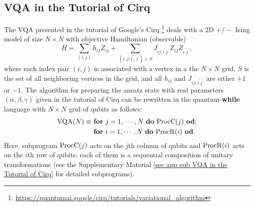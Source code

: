 \documentclass[conference,compsoc, 10pt]{IEEEtran}
\newcommand{\jh}[1]{\textit{\color{red}[JH] : #1}}
\newcommand{\lz}[1]{\textit{\color{blue}[LZ] : #1}}
\begin{document}
	\subsection{VQA in the Tutorial of Cirq}
	
	The VQA presented in the tutorial of Google's Cirq \footnote{\url{https://quantumai.google/cirq/tutorials/variational_algorithm}} deals with a 2D $+/-$ Ising model of size $N\times N$ with objective Hamiltonian (observable)
	$$H = \sum_{(i,j)}h_{ij}Z_{ij} + \sum_{(i,j;i^\prime,j^\prime)\in S}J_{ij;i^\prime j^\prime}Z_{ij}Z_{i^\prime j^\prime},$$
	where each index pair $(i,j)$ is associated with a vertex in a the $N\times N$ grid, $S$ is the set of all neighboring vertices in the grid, and all $h_{ij}$ and $J_{ij;i^\prime j^\prime}$ are either $+1$ or $-1$.
	The algorithm for preparing the ansatz state with real parameters $(\alpha,\beta,\gamma)$ given in the tutorial of Cirq can be rewritten in the quantum-{\bf while} language with $N\times N$ grid of qubits as follows:
	\begin{align*}
	{\rm VQA}(N)\equiv\ &{\bf for\ } j = 1,\cdots,N {\bf\ do}\ {\rm ProcC}(j)\ {\bf od}; \\
	&{\bf for\ } i = 1,\cdots,N {\bf\ do}\ {\rm ProcR}(i)\ {\bf od}.
	\end{align*}
	Here, subprogram ${\rm ProcC}(j)$ acts on the $j$th column of qubits and ${\rm ProcR}(i)$ acts on the $i$th row of qubits; each of them is a sequential composition of unitary transformations (see the Supplementary Material \ref{sec app sub VQA in the Tutorial of Cirq} for detailed subprograms).
	
\end{document}
